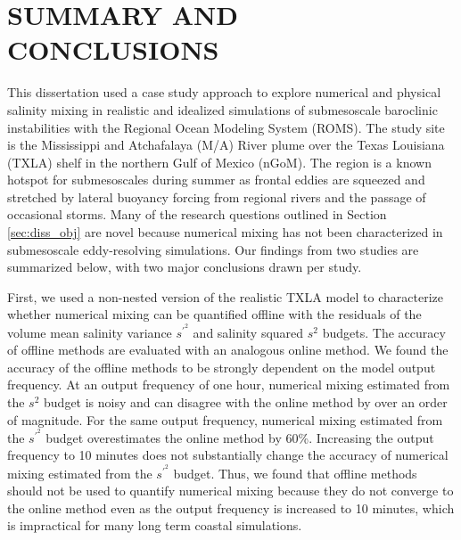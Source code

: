 

\chapter{SUMMARY AND CONCLUSIONS \label{cha:Summary}}
This dissertation used a case study approach to explore numerical and physical salinity mixing in realistic and idealized simulations of submesoscale baroclinic instabilities with the Regional Ocean Modeling System (ROMS). The study site is the Mississippi and Atchafalaya (M/A) River plume over the Texas Louisiana (TXLA) shelf in the northern Gulf of Mexico (nGoM). The region is a known hotspot for submesoscales during summer as frontal eddies are squeezed and stretched by lateral buoyancy forcing from regional rivers and the passage of occasional storms. Many of the research questions outlined in Section \ref{sec:diss_obj} are novel because numerical mixing has not been characterized in submesoscale eddy-resolving simulations. Our findings from two studies are summarized below, with two major conclusions drawn per study. 

First, we used a non-nested version of the realistic TXLA model to characterize whether numerical mixing can be quantified offline with the residuals of the volume mean salinity variance $s^{\prime^2}$ and salinity squared $s^2$ budgets. The accuracy of offline methods are evaluated with an analogous online method. We found the accuracy of the offline methods to be strongly dependent on the model output frequency. At an output frequency of one hour, numerical mixing estimated from the $s^2$ budget is noisy and can disagree with the online method by over an order of magnitude. For the same output frequency, numerical mixing estimated from the $s^{\prime^2}$ budget overestimates the online method by 60\%. Increasing the output frequency to 10 minutes does not substantially change the accuracy of numerical mixing estimated from the $s^{\prime^2}$ budget. Thus, we found that offline methods should not be used to quantify numerical mixing because they do not converge to the online method even as the output frequency is increased to 10 minutes, which is impractical for many long term coastal simulations. 

